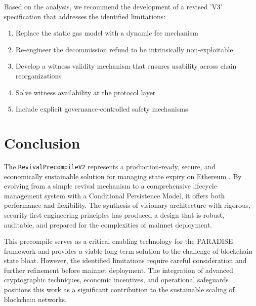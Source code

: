 \documentclass{article}
\begin{document}
Based on the analysis, we recommend the development of a revised 'V3' specification that addresses the identified limitations:

\begin{enumerate}
\item Replace the static gas model with a dynamic fee mechanism
\item Re-engineer the decommission refund to be intrinsically non-exploitable
\item Develop a witness validity mechanism that ensures usability across chain reorganizations
\item Solve witness availability at the protocol layer
\item Include explicit governance-controlled safety mechanisms
\end{enumerate}

\section{Conclusion}

The \texttt{RevivalPrecompileV2} represents a production-ready, secure, and economically sustainable solution for managing state expiry on Ethereum \cite{ethereum_statelessness_2025}. By evolving from a simple revival mechanism to a comprehensive lifecycle management system with a Conditional Persistence Model, it offers both performance and flexibility. The synthesis of visionary architecture with rigorous, security-first engineering principles has produced a design that is robust, auditable, and prepared for the complexities of mainnet deployment.

This precompile serves as a critical enabling technology for the PARADISE framework and provides a viable long-term solution to the challenge of blockchain state bloat. However, the identified limitations require careful consideration and further refinement before mainnet deployment. The integration of advanced cryptographic techniques, economic incentives, and operational safeguards positions this work as a significant contribution to the sustainable scaling of blockchain networks.




\end{document}
